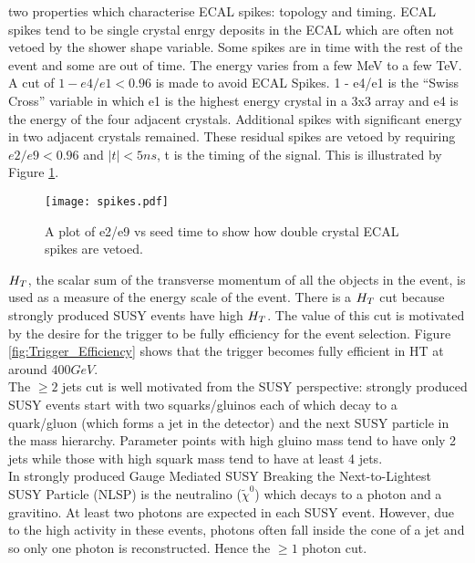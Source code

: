 \begin{itemize}
two properties which characterise ECAL spikes: topology and timing. ECAL spikes 
tend to be single crystal enrgy deposits in the ECAL which are often not vetoed 
by the shower shape variable. Some spikes are in time with the rest of the event 
and some are out of time. The energy varies from a few MeV to a few TeV. A 
cut of $1 - e4/e1 < 0.96$ is made to avoid ECAL Spikes. 1 - e4/e1 is the ``Swiss 
Cross'' variable in which e1 is the highest energy crystal in a 3x3 array and e4 
is the energy of the four adjacent crystals. Additional spikes with significant
energy in two adjacent crystals remained. These residual spikes are vetoed by
requiring $e2/e9 < 0.96$ and $|t| < 5\unit{ns}$, t is the timing of the signal. This 
is illustrated by Figure \ref{fig:spikes}.
\end{itemize}

\begin{figure}
\begin{center}
\texttt{[image: spikes.pdf]}
\end{center}
\caption{A plot of e2/e9 vs seed time to show how double crystal ECAL spikes are
vetoed.}
\label{fig:spikes}
\end{figure}

$H_{T}$, the scalar sum of the transverse momentum of all the objects in the 
event, is used as a measure of the energy scale of the event. There is a $H_{T}$ 
cut because strongly produced SUSY events have high $H_{T}$. The value of this cut
is motivated by the desire for the trigger to be fully efficiency for the event
selection. Figure \ref{fig:Trigger_Efficiency} shows that the trigger becomes
fully efficient in HT at around $400\unit{GeV}$. \\

The $\geq 2$ jets cut is well motivated from the SUSY perspective: strongly
produced SUSY events start with two squarks/gluinos each of which decay to a 
quark/gluon (which forms a jet in the detector) and the next SUSY particle in 
the mass hierarchy. Parameter points with high gluino mass tend to have only 2 
jets while those with high squark mass tend to have at least 4 jets. \\

In strongly produced Gauge Mediated SUSY Breaking the Next-to-Lightest SUSY 
Particle (NLSP) is the neutralino ($\tilde{\chi}^{0}$) which decays to a photon 
and a gravitino. At least two photons are expected in each SUSY event. However, 
due to the high activity in these events, photons often fall inside the cone of
a jet and so only one photon is reconstructed. Hence the $\geq 1$ photon cut. \\

